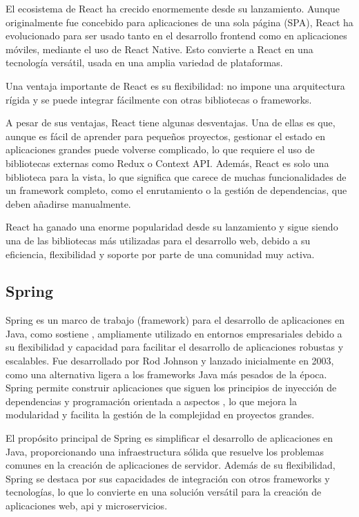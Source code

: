 \documentclass[draft]{scrbook}
\begin{document}
El ecosistema de React ha crecido enormemente desde su lanzamiento. Aunque originalmente fue concebido para aplicaciones de una sola página (SPA), React ha evolucionado para ser usado tanto en el desarrollo frontend como en aplicaciones móviles, mediante el uso de React Native. Esto convierte a React en una tecnología versátil, usada en una amplia variedad de plataformas.

Una ventaja importante de React es su flexibilidad: no impone una arquitectura rígida y se puede integrar fácilmente con otras bibliotecas o frameworks. 

A pesar de sus ventajas, React tiene algunas desventajas. Una de ellas es que, aunque es fácil de aprender para pequeños proyectos, gestionar el estado en aplicaciones grandes puede volverse complicado, lo que requiere el uso de bibliotecas externas como Redux o Context API. Además, React es solo una biblioteca para la vista, lo que significa que carece de muchas funcionalidades de un framework completo, como el enrutamiento o la gestión de dependencias, que deben añadirse manualmente.

React ha ganado una enorme popularidad desde su lanzamiento y sigue siendo una de las bibliotecas más utilizadas para el desarrollo web, debido a su eficiencia, flexibilidad y soporte por parte de una comunidad muy activa.

\subsection{ Spring }
Spring es un marco de trabajo (framework) para el desarrollo de aplicaciones en Java, como sostiene \cite{spring-def}
, ampliamente utilizado en entornos empresariales debido a su flexibilidad y capacidad para facilitar el desarrollo de aplicaciones robustas y escalables. Fue desarrollado por Rod Johnson y lanzado inicialmente en 2003, como una alternativa ligera a los frameworks Java más pesados de la época. Spring permite construir aplicaciones que siguen los principios de inyección de dependencias y programación orientada a aspectos \cite{aop}
, lo que mejora la modularidad y facilita la gestión de la complejidad en proyectos grandes.



El propósito principal de Spring es simplificar el desarrollo de aplicaciones en Java, proporcionando una infraestructura sólida que resuelve los problemas comunes en la creación de aplicaciones de servidor. Además de su flexibilidad, Spring se destaca por sus capacidades de integración con otros frameworks y tecnologías, lo que lo convierte en una solución versátil para la creación de aplicaciones web, \gls{api}
y microservicios.
\end{document}
